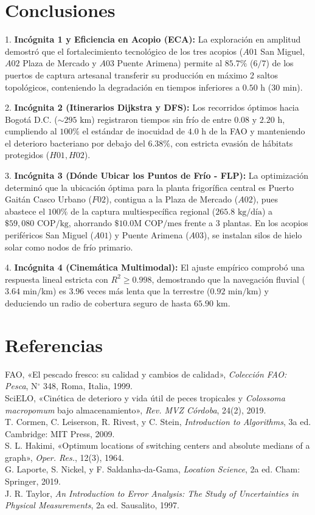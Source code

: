 \documentclass[10pt,twocolumn,a4paper]{article}
\begin{document}
\section{Conclusiones}
1. \textbf{Incógnita 1 y Eficiencia en Acopio (ECA):} La exploración en amplitud demostró que el fortalecimiento tecnológico de los tres acopios ($A01$ San Miguel, $A02$ Plaza de Mercado y $A03$ Puente Arimena) permite al $85.7\%$ ($6/7$) de los puertos de captura artesanal transferir su producción en máximo 2 saltos topológicos, conteniendo la degradación en tiempos inferiores a $0.50\text{ h}$ ($30\text{ min}$).

2. \textbf{Incógnita 2 (Itinerarios Dijkstra y DFS):} Los recorridos óptimos hacia Bogotá D.C. ($\sim 295\text{ km}$) registraron tiempos sin frío de entre $0.08\text{ y }2.20\text{ h}$, cumpliendo al $100\%$ el estándar de inocuidad de $4.0\text{ h}$ de la FAO y manteniendo el deterioro bacteriano por debajo del $6.38\%$, con estricta evasión de hábitats protegidos ($H01, H02$).

3. \textbf{Incógnita 3 (Dónde Ubicar los Puntos de Frío - FLP):} La optimización determinó que la ubicación óptima para la planta frigorífica central es Puerto Gaitán Casco Urbano ($F02$), contigua a la Plaza de Mercado ($A02$), pues abastece el $100\%$ de la captura multiespecífica regional ($265.8\text{ kg/día}$) a $\$59,080\text{ COP/kg}$, ahorrando $\$10.0\text{M COP/mes}$ frente a 3 plantas. En los acopios periféricos San Miguel ($A01$) y Puente Arimena ($A03$), se instalan silos de hielo solar como nodos de frío primario.

4. \textbf{Incógnita 4 (Cinemática Multimodal):} El ajuste empírico comprobó una respuesta lineal estricta con $R^2 \ge 0.998$, demostrando que la navegación fluvial ($3.64\text{ min/km}$) es 3.96 veces más lenta que la terrestre ($0.92\text{ min/km}$) y deduciendo un radio de cobertura seguro de hasta $65.90\text{ km}$.

\section*{Referencias}
\fontsize{7.5pt}{8.8pt}\selectfont
\noindent [1] FAO, «El pescado fresco: su calidad y cambios de calidad», \textit{Colección FAO: Pesca}, N$^\circ$ 348, Roma, Italia, 1999.\\[0.02cm]
\noindent [2] SciELO, «Cinética de deterioro y vida útil de peces tropicales y \textit{Colossoma macropomum} bajo almacenamiento», \textit{Rev. MVZ Córdoba}, 24(2), 2019.\\[0.02cm]
\noindent [3] T. Cormen, C. Leiserson, R. Rivest, y C. Stein, \textit{Introduction to Algorithms}, 3a ed. Cambridge: MIT Press, 2009.\\[0.02cm]
\noindent [4] S. L. Hakimi, «Optimum locations of switching centers and absolute medians of a graph», \textit{Oper. Res.}, 12(3), 1964.\\[0.02cm]
\noindent [5] G. Laporte, S. Nickel, y F. Saldanha-da-Gama, \textit{Location Science}, 2a ed. Cham: Springer, 2019.\\[0.02cm]
\noindent [6] J. R. Taylor, \textit{An Introduction to Error Analysis: The Study of Uncertainties in Physical Measurements}, 2a ed. Sausalito, 1997.
\end{document}

